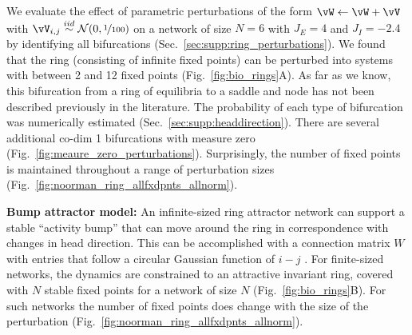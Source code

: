 \documentclass{article} %
\newcommand{\ptitle}[1]{\textbf{#1:}\xspace}
\newcommand{\mpcomment}[1]{\textcolor{mpcolor}{(#1)}}
\newcounter{ct}
\newcommand{\iidsample}{\stackrel{iid}{\sim}}
\theoremstyle{definition}
\theoremstyle{remark}
\begin{document}
We evaluate the effect of parametric perturbations of the form \( \vW \leftarrow \vW + \vV\) with \(\vV_{i,j}\iidsample\mathcal{N}(0,\nicefrac{1}{100})\) on a network of size \(N = 6\) with \(J_E= 4\) and \(J_I=-2.4\) by identifying all bifurcations (Sec.~\ref{sec:supp:ring_perturbations}).
We found that the ring (consisting of infinite fixed points) can be perturbed into systems with between 2 and 12 fixed points (Fig.~\ref{fig:bio_rings}A).
As far as we know, this bifurcation from a ring of equilibria to a saddle and node has not been described previously in the literature.
The probability of each type of bifurcation was numerically estimated (Sec.~\ref{sec:supp:headdirection}).
There are several additional co-dim 1 bifurcations with measure zero (Fig.~\ref{fig:meaure_zero_perturbations}).
Surprisingly, the number of fixed points is maintained throughout a range of perturbation sizes (Fig.~\ref{fig:noorman_ring_allfxdpnts_allnorm}).


\ptitle{Bump attractor model}
An infinite-sized ring attractor network can support a stable ``activity bump'' that can move around the ring in correspondence with changes in head direction.
This can be accomplished with a connection matrix \(W\) with entries that follow a circular Gaussian function of \(i-j\) \citep{seeholzer2017efficient,redish1996coupled,goodridge2000,compte2000synaptic}.
For finite-sized networks, the dynamics are constrained to an attractive invariant ring, covered with \(N\) stable fixed points for a network of size \(N\) (Fig.~\ref{fig:bio_rings}B).
For such networks the number of fixed points does change with the size of the perturbation (Fig.~\ref{fig:noorman_ring_allfxdpnts_allnorm}).
\end{document}
